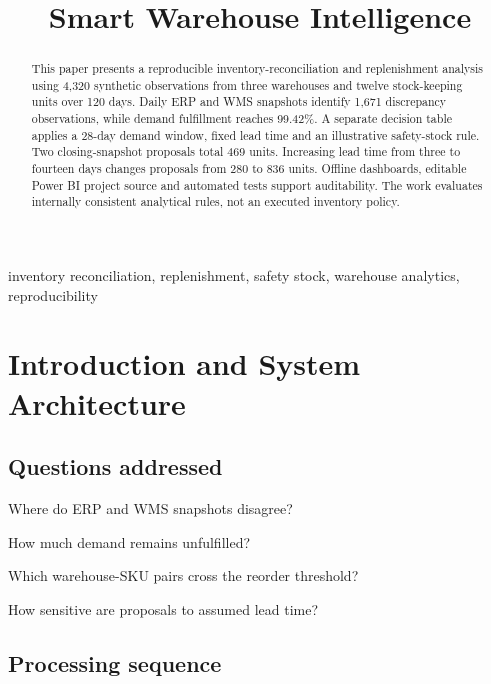 \documentclass[conference,letterpaper]{IEEEtran}
\begin{document}
\title{Smart Warehouse Intelligence}
\author{}
\maketitle
\thispagestyle{plain}\pagestyle{plain}
\begin{abstract}This paper presents a reproducible inventory-reconciliation and replenishment analysis using 4,320 synthetic observations from three warehouses and twelve stock-keeping units over 120 days. Daily ERP and WMS snapshots identify 1,671 discrepancy observations, while demand fulfillment reaches 99.42\%. A separate decision table applies a 28-day demand window, fixed lead time and an illustrative safety-stock rule. Two closing-snapshot proposals total 469 units. Increasing lead time from three to fourteen days changes proposals from 280 to 836 units. Offline dashboards, editable Power BI project source and automated tests support auditability. The work evaluates internally consistent analytical rules, not an executed inventory policy.\end{abstract}

\begin{IEEEkeywords}inventory reconciliation, replenishment, safety stock, warehouse analytics, reproducibility\end{IEEEkeywords}

\section{Introduction and System Architecture}

\subsection{Questions addressed}

\textbullet{} Where do ERP and WMS snapshots disagree?


\textbullet{} How much demand remains unfulfilled?


\textbullet{} Which warehouse-SKU pairs cross the reorder threshold?


\textbullet{} How sensitive are proposals to assumed lead time?


\subsection{Processing sequence}
\end{document}
